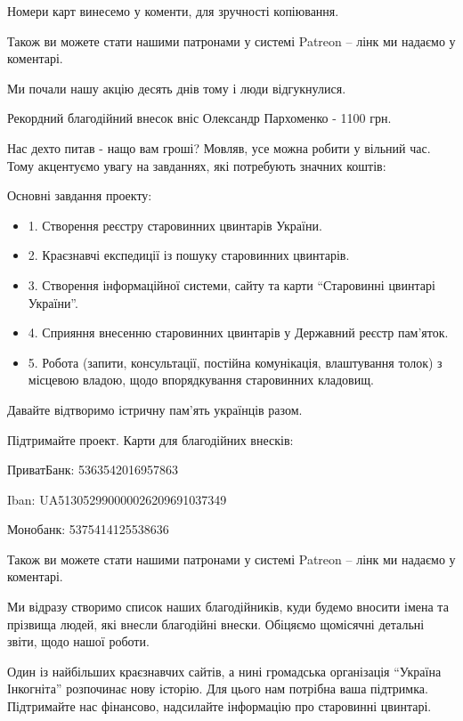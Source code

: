Номери карт винесемо у коменти, для зручності копіювання.

Також ви можете стати нашими патронами у системі Patreon – лінк ми надаємо у
коментарі.


Ми почали нашу акцію десять днів тому і люди відгукнулися. 

Рекордний благодійний внесок вніс Олександр Пархоменко - 1100 грн. 


Нас дехто питав - нащо вам гроші? Мовляв, усе можна робити у вільний час. Тому
акцентуємо увагу на завданнях, які потребують значних коштів:

Основні завдання проекту:

\begin{itemize}
  \item 1. Створення реєстру старовинних цвинтарів України.
  \item 2. Краєзнавчі експедиції із пошуку старовинних цвинтарів.
  \item 3. Створення інформаційної системи, сайту та карти \enquote{Старовинні цвинтарі України}.
  \item 4. Сприяння внесенню старовинних цвинтарів у Державний реєстр пам’яток.
  \item 5. Робота (запити, консультації, постійна комунікація, влаштування
          толок) з місцевою владою, щодо впорядкування старовинних кладовищ.
\end{itemize}

Давайте відтворимо істричну пам’ять українців разом. 

Підтримайте проект.  Карти для благодійних внесків:

ПриватБанк: 5363542016957863

Iban: UA513052990000026209691037349

Монобанк: 5375414125538636

Також ви можете стати нашими патронами у системі Patreon – лінк ми надаємо у коментарі.

Ми відразу створимо список наших благодійників, куди будемо вносити імена та
прізвища людей, які внесли благодійні внески. Обіцяємо щомісячні детальні
звіти, щодо нашої роботи.

Один із найбільших краєзнавчих сайтів, а нині громадська організація “Україна
Інкогніта” розпочинає нову історію. Для цього нам потрібна ваша підтримка.
Підтримайте нас фінансово, надсилайте інформацію про старовинні цвинтарі. 

